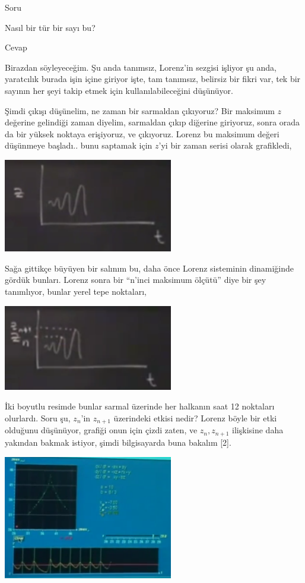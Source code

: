 \documentclass[12pt,fleqn]{article}\usepackage{../../common}
\begin{document}
Soru

Nasıl bir tür bir sayı bu? 

Cevap

Birazdan söyleyeceğim. Şu anda tanımsız, Lorenz'in sezgisi işliyor şu anda,
yaratcılık burada işin içine giriyor işte, tam tanımsız, belirsiz bir fikri
var, tek bir sayının her şeyi takip etmek için kullanılabileceğini
düşünüyor. 

Şimdi çıkışı düşünelim, ne zaman bir sarmaldan çıkıyoruz? Bir maksimum $z$
değerine gelindiği zaman diyelim, sarmaldan çıkıp diğerine giriyoruz, sonra
orada da bir yüksek noktaya erişiyoruz, ve çıkıyoruz. Lorenz bu maksimum
değeri düşünmeye başladı.. bunu saptamak için $z$'yi bir zaman serisi
olarak grafikledi, 

\includegraphics[width=20em]{18_05.png}

Sağa gittikçe büyüyen bir salınım bu, daha önce Lorenz sisteminin
dinamiğinde gördük bunları. Lorenz sonra bir ``n'inci maksimum ölçütü''
diye bir şey tanımlıyor, bunlar yerel tepe noktaları,

\includegraphics[width=20em]{18_06.png}

İki boyutlu resimde bunlar sarmal üzerinde her halkanın saat 12 noktaları
olurlardı. Soru şu, $z_n$'in $z_{n+1}$ üzerindeki etkisi nedir? Lorenz
böyle bir etki olduğunu düşünüyor, grafiği onun için çizdi zaten, ve
$z_n,z_{n+1}$ ilişkisine daha yakından bakmak istiyor, şimdi bilgisayarda
buna bakalım [2]. 

\includegraphics[width=20em]{18_07.png}
\end{document}
